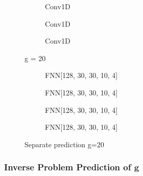 \documentclass[a4paper,times,12pt]{article}
\begin{document}
\begin{figure}[H]
    \centering
    \begin{subfigure}[t]{0.45\textwidth}
		\centering
        
        \caption{Conv1D}
		\label{fig:a}
    \end{subfigure}\hfill
    \begin{subfigure}[t]{0.45\textwidth}
		\centering
        
        \caption{Conv1D}
		\label{fig:b}
    \end{subfigure}\hfill    
    \begin{subfigure}[t]{0.45\textwidth}
        \centering
        
        \caption{Conv1D}
		\label{fig:c}
    \end{subfigure}
	\caption{g = 20}
\end{figure}

\begin{figure}[H]
    \centering
    \begin{subfigure}[t]{0.45\textwidth}
		\centering
        
        \caption{FNN[128, 30, 30, 10, 4]}
		\label{fig:a}
    \end{subfigure}\hfill
    \begin{subfigure}[t]{0.45\textwidth}
		\centering
        
        \caption{FNN[128, 30, 30, 10, 4]}
		\label{fig:b}
    \end{subfigure}\hfill    
    \begin{subfigure}[t]{0.45\textwidth}
        \centering
        
        \caption{FNN[128, 30, 30, 10, 4]}
		\label{fig:c}
    \end{subfigure}\hfill
    \begin{subfigure}[t]{0.45\textwidth}
        \centering
        
        \caption{FNN[128, 30, 30, 10, 4]}
		\label{fig:c}
    \end{subfigure}
	\caption{Separate prediction  g=20}
\end{figure}

\subsubsection{Inverse Problem Prediction of $\boldsymbol{g}$}
\end{document}
